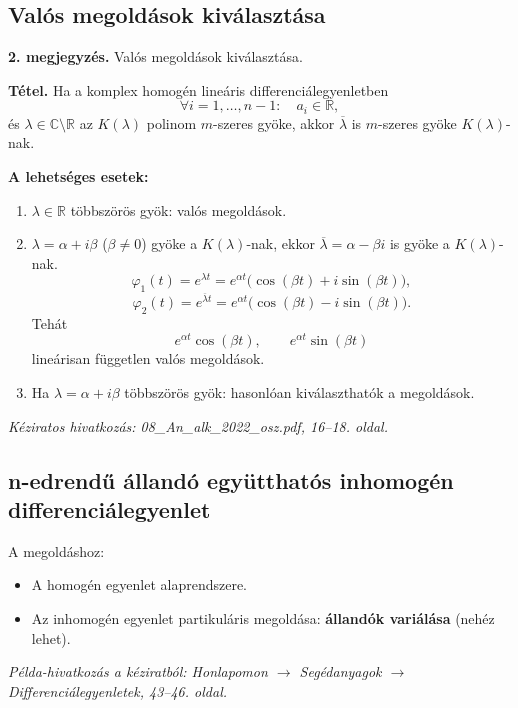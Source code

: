 \subsection{Valós megoldások kiválasztása}
\textbf{2. megjegyzés.} Valós megoldások kiválasztása.

\begin{matbox}
\textbf{Tétel.} Ha a komplex homogén lineáris differenciálegyenletben
\[
 \forall i=1,\ldots,n-1:\quad a_i\in\mathbb R,
\]
és $\lambda\in\mathbb C\setminus\mathbb R$ az $K(\lambda)$
polinom $m$-szeres gyöke, akkor $\overline\lambda$ is
$m$-szeres gyöke $K(\lambda)$-nak.
\end{matbox}

\textbf{A lehetséges esetek:}
\begin{enumerate}[label=\arabic*$^\circ$)]
\item $\lambda\in\mathbb R$ többszörös gyök:
      valós megoldások.
\item $\lambda=\alpha+i\beta$ ($\beta\ne0$) gyöke a
      $K(\lambda)$-nak, ekkor $\overline\lambda=\alpha-\beta i$
      is gyöke a $K(\lambda)$-nak.
      \[
       \varphi_1(t)=e^{\lambda t}
       =e^{\alpha t}\bigl(\cos(\beta t)+i\sin(\beta t)\bigr),
      \]
      \[
       \varphi_2(t)=e^{\overline\lambda t}
       =e^{\alpha t}\bigl(\cos(\beta t)-i\sin(\beta t)\bigr).
      \]
      Tehát
      \[
       \boxed{e^{\alpha t}\cos(\beta t),\qquad
              e^{\alpha t}\sin(\beta t)}
      \]
      lineárisan független valós megoldások.
\item Ha $\lambda=\alpha+i\beta$ többszörös gyök:
      hasonlóan kiválaszthatók a megoldások.
\end{enumerate}
\textit{Kéziratos hivatkozás: 08\_An\_alk\_2022\_osz.pdf,
16--18. oldal.}

\subsection{n-edrendű állandó együtthatós inhomogén differenciálegyenlet}
A megoldáshoz:
\begin{itemize}
 \item A homogén egyenlet alaprendszere.
 \item Az inhomogén egyenlet partikuláris megoldása:
       \textbf{állandók variálása} (nehéz lehet).
\end{itemize}
\textit{Példa-hivatkozás a kéziratból: Honlapomon $\to$
Segédanyagok $\to$ Differenciálegyenletek, 43--46. oldal.}

